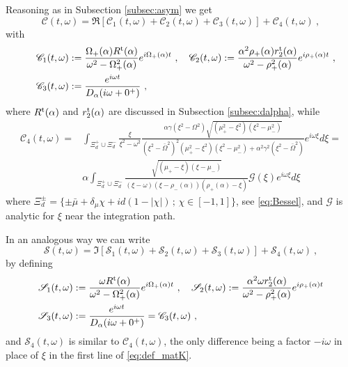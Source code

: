 \documentclass[11pt]{article}
\numberwithin{equation}{section}
\numberwithin{theorem}{section}
\newcommand{\matC}{{\mathscr C}}
\newcommand{\matG}{{\mathscr G}}
\newcommand{\matS}{{\mathscr S}}
\newcommand{\x}{\xi}
\begin{document}
Reasoning as in Subsection \ref{subsec:asym} we get
$$
\matC(t,\omega)=
\Re{\left[\matC_1(t,\omega)+\matC_2(t,\omega)+
\matC_3(t,\omega)\right]}+\matC_4(t,\omega) \ ,
$$
with
\begin{equation}\label{eq:matC}
  \begin{split}
\matC_1(t,\omega)&:=\frac{\Omega_+(\alpha)R^{\rm 
    t}(\alpha)}{\omega^2-\Omega_+^2(\alpha)}e^{i\Omega_+(\alpha)t}\ ,
  \quad \matC_2(t,\omega):=\frac{\alpha^2
    \rho_+(\alpha)r^{\rm 
      t}_2(\alpha)}{\omega^2-\rho_+^2(\alpha)}e^{i\rho_+(\alpha)t}\ ,\\\quad
\matC_3(t,\omega)&:=\frac{e^{i\omega t}}{D_\alpha(i\omega+0^+)}\ ,
  \end{split}
\end{equation}
where $R^{\rm t}(\alpha)$ and $r^{\rm t}_2(\alpha)$ are discussed in
Subsection \ref{subsec:dalpha}, while
\begin{equation}\label{eq:def_matK}
\begin{aligned}
\matC_4(t,\omega)=&\int_{\Xi^+_d\cup\Xi^-_d}\frac{\xi}{\xi^2-\omega^2}
\frac{\alpha\gamma(\xi^2-\Omega^2)\sqrt{(\mu_+^2-\xi^2)(\x^2-\mu_-^2)}}
{(\xi^2-\bar\Omega^2)^2(\mu_+^2-\xi^2)(\xi^2-\mu_-^2)+\alpha^2\gamma^2(\xi^2-\bar\Omega^2)}e^{i\omega \xi}d\x=\\
&\alpha\int_{\Xi^+_d\cup\Xi^-_d}\frac{\sqrt{(\mu_+-\xi)(\x-\mu_-)}}
{(\xi-\omega)(\xi-\rho_-(\alpha))(\rho_+(\alpha)-\xi)}\matG(\xi)e^{i\omega \xi}d\xi
\end{aligned}
\end{equation}
where $\Xi^\pm_d=\{\pm\bar\mu+\delta_\mu \chi+id(1-|\chi|)\, ;\,
\chi\in[-1,1]\}$, see \eqref{eq:Bessel}, and $\matG$ is analytic for
$\xi$ near the integration path.

In an analogous way we can write
    $$
    \matS(t,\omega)=\Im{\left[\matS_1(t,\omega)+\matS_2(t,\omega)+
\matS_3(t,\omega)\right]}+\matS_4(t,\omega) \ ,
    $$
    by defining
\begin{equation*}
  \begin{split}
    \matS_1(t,\omega)&:=\frac{\omega R^{\rm 
        t}(\alpha)}{\omega^2-\Omega_+^2(\alpha)}e^{i\Omega_+(\alpha)t}\ ,\quad
    \matS_2(t,\omega):=\frac{\alpha^2
  \omega r^{\rm 
    t}_2(\alpha)}{\omega^2-\rho_+^2(\alpha)}e^{i\rho_+(\alpha)t}\\
    \matS_3(t,\omega)&:=\frac{e^{i\omega t}}{D_\alpha(i\omega+0^+)}=\matC_3(t,\omega)\ ,
  \end{split}
\end{equation*}
and $\matS_4(t,\omega)$ is similar to $\matC_4(t,\omega)$, the
only difference being a factor $-i\omega$ in place of $\xi$ in the
first line of \eqref{eq:def_matK}. 
\end{document}
